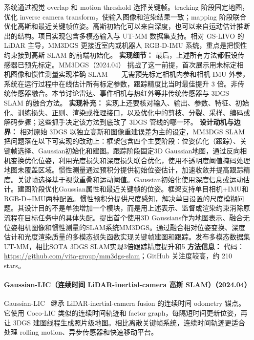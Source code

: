 系统通过视觉 overlap 和 motion threshold 选择关键帧。tracking 阶段固定地图，优化 inverse camera transform，使输入图像和渲染结果一致；mapping 阶段联合优化高斯和最近关键帧位姿。高斯初始化可以来自深度，也可以来自运动估计推断出的结构。项目实现包含多模态输入与 UT-MM 数据集支持。相对 GS-LIVO 的 LiDAR 主导，MM3DGS 更接近室内或机器人 RGB-D-IMU 系统，重点是把惯性约束接到高斯 SLAM 的前端初始化。
\textbf{实现细节：} 最后，上述所有方法都假设传感器已预先标定。MM3DGS（2024.04） 挑战了这一前提，首次展示用未标定相机图像和惯性测量实现准确 SLAM——无需预先标定相机内参和相机-IMU 外参，系统在运行过程中在线估计所有标定参数，跟踪精度比当时最佳提升 3 倍。非传统传感器融合。本节讨论雷达、事件相机与热红外等非传统传感器与 3DGS SLAM 的融合方法。
\textbf{实现补充：} 实现上还要核对输入、输出、参数、特征、初始化、训练损失、正则、渲染或推理接口，以及优化中的剪枝、分裂、采样、编码或解码步骤；这些抓手决定该方法到底改了 3DGS 管线的哪一环。
\textbf{设计动机与边界：} 相对原始 3DGS 以独立高斯和图像重建误差为主的设定，MM3DGS SLAM 把问题落在以下可实现的改动上：框架包含四个主要阶段：位姿优化（跟踪）、关键帧选择、Gaussian初始化和建图。跟踪阶段固定3D Gaussian地图，通过反向相机变换优化位姿，利用光度损失和深度损失联合优化，使用不透明度阈值掩码处理地图未覆盖区域。惯性测量通过预积分提供初始位姿估计，加速收敛并提高跟踪精度。关键帧选择基于视觉重叠和运动阈值。Gaussian初始化使用深度信息或运动估计。建图阶段优化Gaussian属性和最近关键帧的位姿。框架支持单目相机+IMU和RGB-D+IMU两种配置。惯性预积分提供尺度感知，解决单目设置的尺度模糊问题。其设计目的不是单独增加一个模块，而是用上述表示、监督或渲染约束消除原流程在目标任务中的具体失配。提出首个使用3D Gaussians作为地图表示、融合无位姿相机图像和惯性测量的SLAM系统MM3DGS。通过融合相对位姿变换、深度估计和光度渲染质量的多模态损失函数实现关键帧建图和跟踪。发布多模态数据集UT-MM，相比SOTA 3DGS SLAM实现3倍跟踪精度提升和5%
\textbf{方法信息：} 代码：\url{https://github.com/vita-group/mm3dgs-slam}；GitHub 关注度较高，约 210 stars。



\paragraph{Gaussian-LIC（连续时间 LiDAR-inertial-camera 高斯 SLAM）（2024.04）}
Gaussian-LIC~\cite{2404_06926} 继承 LiDAR-inertial-camera fusion 的连续时间 odometry 锚点。它使用 Coco-LIC 类似的连续时间轨迹和 factor graph，每隔短时间更新位姿，再让 3DGS 建图线程生成照片级地图。相比离散关键帧系统，连续时间轨迹更适合处理 rolling motion、异步传感器和快速移动平台。

